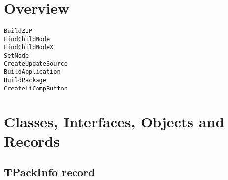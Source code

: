 \documentclass{report}
\newif\ifpdf
\begin{document}
\section{Overview}
\begin{description}
\item[\texttt{\begin{ttfamily}TPackInfo\end{ttfamily} record}]
\end{description}
\begin{description}
\item[\texttt{BuildZIP}]
\item[\texttt{FindChildNode}]
\item[\texttt{FindChildNodeX}]
\item[\texttt{SetNode}]
\item[\texttt{CreateUpdateSource}]
\item[\texttt{BuildApplication}]
\item[\texttt{BuildPackage}]
\item[\texttt{CreateLiCompButton}]
\end{description}
\section{Classes, Interfaces, Objects and Records}
\ifpdf
\subsection*{\large{\textbf{TPackInfo record}}\normalsize\hspace{1ex}\hrulefill}
\else
\subsection*{TPackInfo record}
\fi
\label{ipkbuild.TPackInfo}
\end{document}
